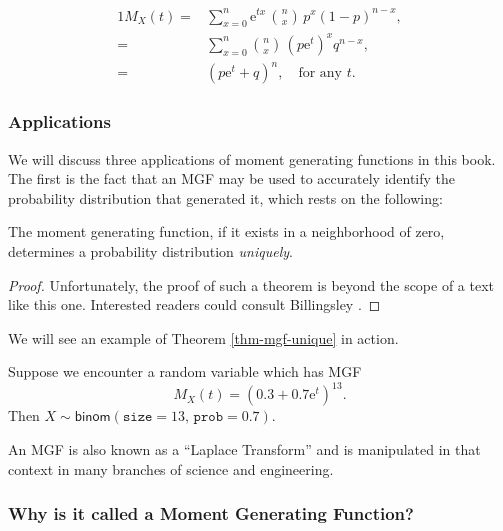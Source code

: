 \documentclass[captions=tableheading]{scrbook}
\begin{document}
\begin{alignat*}{1}
M_{X}(t)= & \sum_{x=0}^{n}\mathrm{e}^{tx}\,{n \choose x}\, p^{x}(1-p)^{n-x},\\
= & \sum_{x=0}^{n}{n \choose x}\,(p\mathrm{e}^{t})^{x}q^{n-x},\\
= & (p\mathrm{e}^{t}+q)^{n},\quad \mbox{for any $t$.}
\end{alignat*}
\subsubsection{Applications}
\label{sec-5-4-2-1}


We will discuss three applications of moment generating functions in this book. The first is the fact that an MGF may be used to accurately identify the probability distribution that generated it, which rests on the following:

\begin{thm}
The moment generating function, if it exists in a neighborhood of zero, determines a probability distribution \emph{uniquely}. 
\end{thm}

\begin{proof}
Unfortunately, the proof of such a theorem is beyond the scope of a text like this one. Interested readers could consult Billingsley \cite{Billingsley1995}.
\end{proof}


We will see an example of Theorem \ref{thm-mgf-unique} in action.

\begin{example}
Suppose we encounter a random variable which has MGF
\[
M_{X}(t)=(0.3+0.7\mathrm{e}^{t})^{13}.
\]
Then \(X\sim\mathsf{binom}(\mathtt{size}=13,\,\mathtt{prob}=0.7)\).
\end{example}

An MGF is also known as a ``Laplace Transform'' and is manipulated in that context in many branches of science and engineering.
\subsubsection{Why is it called a Moment Generating Function?}
\label{sec-5-4-2-2}
\end{document}
